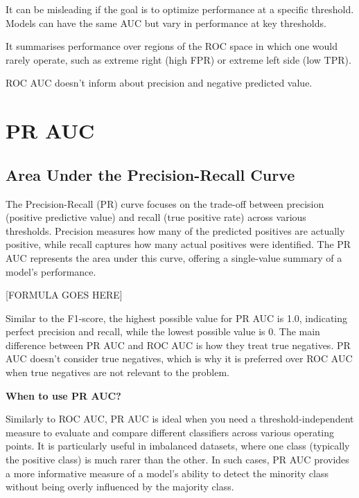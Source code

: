 {
\item It can be misleading if the goal is to optimize performance at a specific threshold. Models can have the same AUC but vary in performance at key thresholds.
\item It summarises performance over regions of the ROC space in which one would rarely operate, such as extreme right (high FPR) or extreme left side (low TPR).
\item ROC AUC doesn't inform about precision and negative predicted value.
}

\clearpage
\thispagestyle{classificationstyle}
\section{PR AUC}
\subsection{Area Under the Precision-Recall Curve}

The Precision-Recall (PR) curve focuses on the trade-off between precision (positive predictive value) and recall (true positive rate) across various thresholds.
Precision measures how many of the predicted positives are actually positive, while recall captures how many actual positives were identified.
The PR AUC represents the area under this curve, offering a single-value summary of a model's performance.

\begin{center}
    [FORMULA GOES HERE]
\end{center}

Similar to the F1-score, the highest possible value for PR AUC is 1.0, indicating perfect precision and recall, while the lowest possible value is 0.
The main difference between PR AUC and ROC AUC is how they treat true negatives. PR AUC doesn't consider true negatives, which is why it is preferred over ROC AUC
when true negatives are not relevant to the problem.

\textbf{When to use PR AUC?}

Similarly to ROC AUC, PR AUC is ideal when you need a threshold-independent measure to evaluate and compare different classifiers across various operating points. 
It is particularly useful in imbalanced datasets, where one class (typically the positive class) is much rarer than the other. In such cases, PR AUC provides a more
informative measure of a model's ability to detect the minority class without being overly influenced by the majority class.

